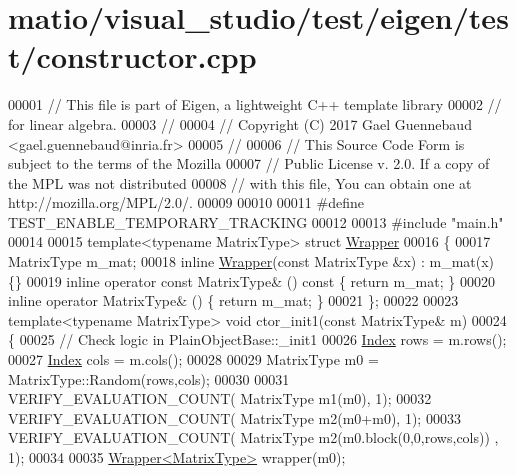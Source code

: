 \hypertarget{matio_2visual__studio_2test_2eigen_2test_2constructor_8cpp_source}{}\section{matio/visual\+\_\+studio/test/eigen/test/constructor.cpp}
\label{matio_2visual__studio_2test_2eigen_2test_2constructor_8cpp_source}

\begin{DoxyCode}
00001 \textcolor{comment}{// This file is part of Eigen, a lightweight C++ template library}
00002 \textcolor{comment}{// for linear algebra.}
00003 \textcolor{comment}{//}
00004 \textcolor{comment}{// Copyright (C) 2017 Gael Guennebaud <gael.guennebaud@inria.fr>}
00005 \textcolor{comment}{//}
00006 \textcolor{comment}{// This Source Code Form is subject to the terms of the Mozilla}
00007 \textcolor{comment}{// Public License v. 2.0. If a copy of the MPL was not distributed}
00008 \textcolor{comment}{// with this file, You can obtain one at http://mozilla.org/MPL/2.0/.}
00009 
00010 
00011 \textcolor{preprocessor}{#define TEST\_ENABLE\_TEMPORARY\_TRACKING}
00012 
00013 \textcolor{preprocessor}{#include "main.h"}
00014 
00015 \textcolor{keyword}{template}<\textcolor{keyword}{typename} MatrixType> \textcolor{keyword}{struct }\hyperlink{struct_wrapper}{Wrapper}
00016 \{
00017   MatrixType m\_mat;
00018   \textcolor{keyword}{inline} \hyperlink{struct_wrapper}{Wrapper}(\textcolor{keyword}{const} MatrixType &x) : m\_mat(x) \{\}
00019   \textcolor{keyword}{inline} \textcolor{keyword}{operator} \textcolor{keyword}{const} MatrixType& () \textcolor{keyword}{const} \{ \textcolor{keywordflow}{return} m\_mat; \}
00020   \textcolor{keyword}{inline} \textcolor{keyword}{operator} MatrixType& () \{ \textcolor{keywordflow}{return} m\_mat; \}
00021 \};
00022 
00023 \textcolor{keyword}{template}<\textcolor{keyword}{typename} MatrixType> \textcolor{keywordtype}{void} ctor\_init1(\textcolor{keyword}{const} MatrixType& m)
00024 \{
00025   \textcolor{comment}{// Check logic in PlainObjectBase::\_init1}
00026   \hyperlink{namespace_eigen_a62e77e0933482dafde8fe197d9a2cfde}{Index} rows = m.rows();
00027   \hyperlink{namespace_eigen_a62e77e0933482dafde8fe197d9a2cfde}{Index} cols = m.cols();
00028 
00029   MatrixType m0 = MatrixType::Random(rows,cols);
00030 
00031   VERIFY\_EVALUATION\_COUNT( MatrixType m1(m0), 1);
00032   VERIFY\_EVALUATION\_COUNT( MatrixType m2(m0+m0), 1);
00033   VERIFY\_EVALUATION\_COUNT( MatrixType m2(m0.block(0,0,rows,cols)) , 1);
00034 
00035   \hyperlink{struct_wrapper}{Wrapper<MatrixType>} wrapper(m0);

\end{DoxyCode}
